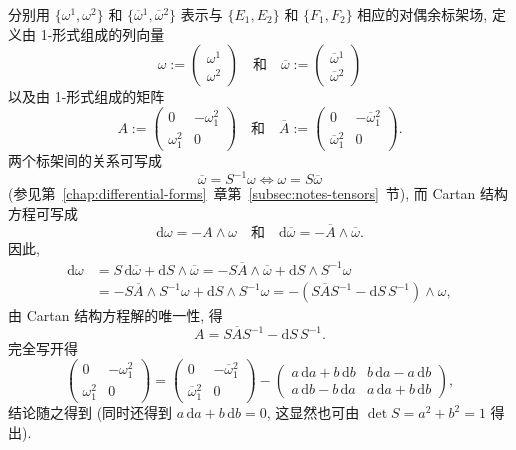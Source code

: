 \begin{RiemannProof}
分别用 $\{\omega^1,\omega^2\}$ 和 $\{\overline\omega{}^1,\overline\omega{}^2\}$ 表示与 $\{E_1,E_2\}$ 和 $\{F_1,F_2\}$ 相应的对偶余标架场, 定义由 1-形式组成的列向量
\[
  \omega:=\begin{pmatrix}\omega^1\\\omega^2\end{pmatrix}
  \quad\text{和}\quad
  \overline\omega:=\begin{pmatrix}\overline\omega{}^1\\\overline\omega{}^2\end{pmatrix}
\]
以及由 1-形式组成的矩阵
\[
  A:=\begin{pmatrix}0&-\omega_1^2\\\omega_1^2&0\end{pmatrix}
  \quad\text{和}\quad
  \overline A:=\begin{pmatrix}0&-\overline\omega{}_1^2\\\overline\omega{}_1^2&0\end{pmatrix}.
\]
两个标架间的关系可写成
\[
  \overline\omega=S^{-1}\omega\Leftrightarrow\omega=S\overline\omega
\]
(参见第~\ref{chap:differential-forms}~章第~\ref{subsec:notes-tensors}~节), 而 Cartan 结构方程可写成
\[
  \mathrm{d}\omega=-A\wedge\omega\quad\text{和}\quad
  \mathrm{d}\overline\omega=-\overline A\wedge\overline\omega.
\]
因此,
\begin{align*}
  \mathrm{d}\omega&=S\,\mathrm{d}\overline\omega+\mathrm{d}S\wedge\overline\omega
    =-S\overline A\wedge\overline\omega+\mathrm{d}S\wedge S^{-1}\omega\\
  &=-S\overline A\wedge S^{-1}\omega+\mathrm{d}S\wedge S^{-1}\omega
    =-(S\overline AS^{-1}-\mathrm{d}S\,S^{-1})\wedge\omega,
\end{align*}
由 Cartan 结构方程解的唯一性, 得
\[
  A=S\overline AS^{-1}-\mathrm{d}S\,S^{-1}.
\]
完全写开得
\[
  \begin{pmatrix}0&-\omega_1^2\\\omega_1^2&0\end{pmatrix}
  =\begin{pmatrix}0&-\overline\omega{}_1^2\\\overline\omega{}_1^2&0\end{pmatrix}
  -\begin{pmatrix}
    a\,\mathrm{d}a+b\,\mathrm{d}b&b\,\mathrm{d}a-a\,\mathrm{d}b\\
    a\,\mathrm{d}b-b\,\mathrm{d}a&a\,\mathrm{d}a+b\,\mathrm{d}b
  \end{pmatrix},
\]
结论随之得到 (同时还得到 $a\,\mathrm{d}a+b\,\mathrm{d}b=0$, 这显然也可由 $\det S=a^2+b^2=1$ 得出).
\end{RiemannProof}

